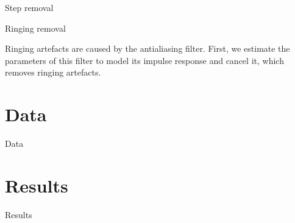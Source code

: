 \documentclass[10pt,serif]{beamer}
\begin{document}
\begin{frame}{Step removal}

    
    






\end{frame}

\begin{frame}{Ringing removal}

  Ringing artefacts are caused by the antialiasing filter. First, we estimate the parameters of this filter to model its impulse response and cancel it, which removes ringing artefacts.


\end{frame}

\section[\color{white} Data]{Data}\label{sec:data}

\begin{frame}{Data}

\end{frame}

\section[\color{white} Data]{Results}\label{sec:results}

\begin{frame}{Results}

\end{frame}
\end{document}
